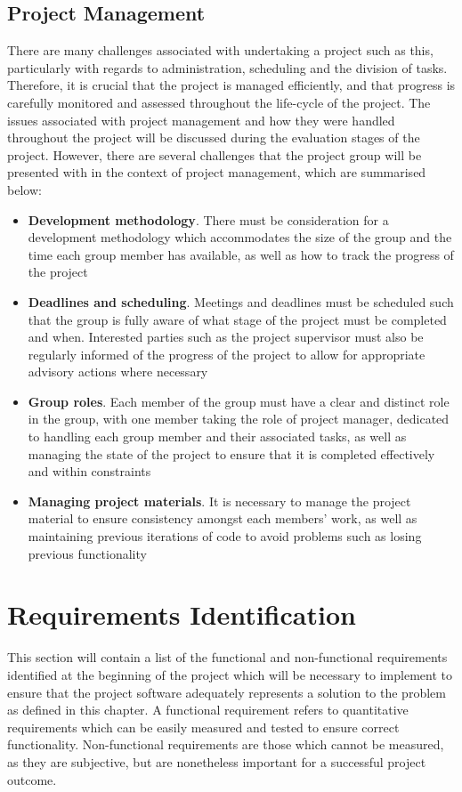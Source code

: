 \documentclass[12pt,a4paper,twoside]{report}
\begin{document}
		\subsection{Project Management}
		There are many challenges associated with undertaking a project such as this, particularly with regards to administration, scheduling and the division of tasks. Therefore, it is crucial that the project is managed efficiently, and that progress is carefully monitored and assessed throughout the life-cycle of the project. The issues associated with project management and how they were handled throughout the project will be discussed during the evaluation stages of the project. However, there are several challenges that the project group will be presented with in the context of project management, which are summarised below:
\begin{itemize}
\item \textbf{Development methodology}. There must be consideration for a development methodology which accommodates the size of the group and the time each group member has available, as well as how to track the progress of the project
\item \textbf{Deadlines and scheduling}. Meetings and deadlines must be scheduled such that the group is fully aware of what stage of the project must be completed and when. Interested parties such as the project supervisor must also be regularly informed of the progress of the project to allow for appropriate advisory actions where necessary
\item \textbf{Group roles}. Each member of the group must have a clear and distinct role in the group, with one member taking the role of project manager, dedicated to handling each group member and their associated tasks, as well as managing the state of the project to ensure that it is completed effectively and within constraints
\item \textbf{Managing project materials}. It is necessary to manage the project material to ensure consistency amongst each members’ work, as well as maintaining previous iterations of code to avoid problems such as losing previous functionality
\end{itemize}
	\section{Requirements Identification}
	This section will contain a list of the functional and non-functional requirements identified at the beginning of the project which will be necessary to implement to ensure that the project software adequately represents a solution to the problem as defined in this chapter. A functional requirement refers to quantitative requirements which can be easily measured and tested to ensure correct functionality. Non-functional requirements are those which cannot be measured, as they are subjective, but are nonetheless important for a successful project outcome. 
\end{document}
